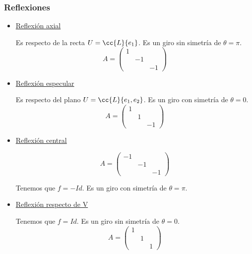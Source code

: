 \subsubsection{Reflexiones}
\begin{itemize}
    \item \underline{Reflexión axial}

    Es respecto de la recta $U=\cc{L}\{e_1\}$.   Es un giro sin simetría de $\theta = \pi$.
    \begin{equation*}
        A=\left(\begin{array}{ccc}
            1 &  \\
             & -1 \\
             && -1
        \end{array}\right)
    \end{equation*}

    \item \underline{Reflexión especular}

    Es respecto del plano $U=\cc{L}\{e_1, e_2\}$.  Es un giro con simetría de $\theta = 0$.
    \begin{equation*}
        A=\left(\begin{array}{ccc}
            1 &  \\
             & 1 \\
             && -1
        \end{array}\right)
    \end{equation*}

    \item \underline{Reflexión central}

    \begin{equation*}
        A=\left(\begin{array}{ccc}
            -1 &  \\
             & -1 \\
             && -1
        \end{array}\right)
    \end{equation*}

    Tenemos que $f=-Id$.  Es un giro con simetría de $\theta = \pi$.

    \item \underline{Reflexión respecto de V}

    Tenemos que $f=Id$. Es un giro sin simetría de $\theta = 0$.
    \begin{equation*}
        A=\left(\begin{array}{ccc}
            1 &  \\
             & 1 \\
             && 1
        \end{array}\right)
    \end{equation*}
\end{itemize}

